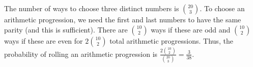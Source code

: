 The number of ways to choose three distinct numbers is $\binom{20}{3}$. To choose an arithmetic progression, we need the first and last numbers to have the same parity (and this is sufficient). There are $\binom{10}{2}$ ways if these are odd and $\binom{10}{2}$ ways if these are even for $2\binom{10}{2}$ total arithmetic progressions. Thus, the probability of rolling an arithmetic progression is $\frac{2\binom{10}{2}}{\binom{20}{3}}=\boxed{\frac{3}{38}}$.